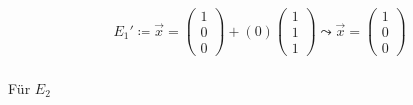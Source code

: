 \begin{gather}
E_1'\coloneqq \vec{x} = \begin{pmatrix}
1\\0\\0
\end{pmatrix}+(0) \begin{pmatrix}
1\\1\\1
\end{pmatrix} 
\leadsto \vec{x} =
\begin{pmatrix}
1\\0\\0
\end{pmatrix}
\end{gather}\\

Für \ensuremath{E_2}  %

